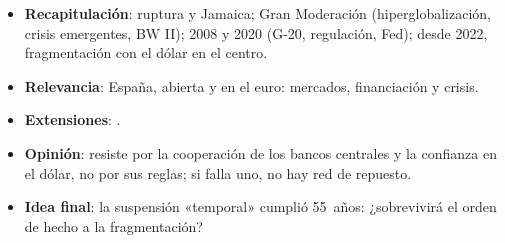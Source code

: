 \documentclass{article}
\begin{document}
\begin{columnas}
\begin{itemize}
\item \textbf{Recapitulación}: ruptura y Jamaica; Gran Moderación (hiperglobalización, crisis emergentes, BW II); 2008 y 2020 (G-20, regulación, Fed); desde 2022, fragmentación con el dólar en el centro.
\item \textbf{Relevancia}: España, abierta y en el euro: mercados, financiación y crisis.
\item \textbf{Extensiones}:    .
\item \textbf{Opinión}: resiste por la cooperación de los bancos centrales y la confianza en el dólar, no por sus reglas; si falla uno, no hay red de repuesto.
\item \textbf{Idea final}: la suspensión «temporal» cumplió 55~años: ¿sobrevivirá el orden de hecho a la fragmentación?
\end{itemize}


\end{columnas}
\end{document}
